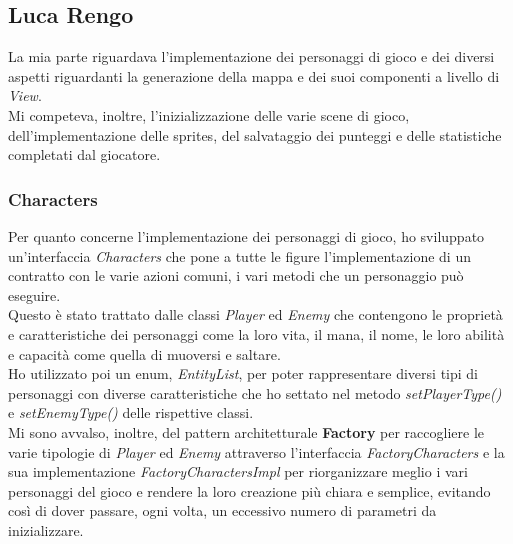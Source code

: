 
\newpage

\subsection*{Luca Rengo}

\textsf{\small La mia parte riguardava l'implementazione dei personaggi di gioco e dei diversi aspetti riguardanti la generazione della mappa e dei suoi componenti a livello di \emph{View}.}\\

\textsf{\small Mi competeva, inoltre, l'inizializzazione delle varie scene di gioco, dell'implementazione delle sprites, del salvataggio dei punteggi e delle statistiche completati dal giocatore.}\\ 

\subsubsection*{Characters}

\textsf{\small Per quanto concerne l'implementazione dei personaggi di gioco, ho sviluppato un'interfaccia \emph{Characters} che pone a tutte le figure l'implementazione di un contratto con le varie azioni comuni, i vari metodi che un personaggio può eseguire.}\\

\textsf{\small Questo è stato trattato dalle classi \emph{Player} ed \emph{Enemy} che contengono le proprietà e caratteristiche dei personaggi come la loro vita, il mana, il nome, le loro abilità e capacità come quella di muoversi e saltare.}\\

\textsf{\small Ho utilizzato poi un enum, \emph{EntityList}, per poter rappresentare diversi tipi di personaggi con diverse caratteristiche che ho settato nel metodo \emph{setPlayerType()} e \emph{setEnemyType()} delle rispettive classi. }\\

\textsf{\small Mi sono avvalso, inoltre, del pattern architetturale \textbf{Factory} per raccogliere le varie tipologie di \emph{Player} ed \emph{Enemy} attraverso l'interfaccia \emph{FactoryCharacters} e la sua implementazione \emph{FactoryCharactersImpl} per riorganizzare meglio i vari personaggi del gioco e rendere la loro creazione più chiara e semplice, evitando così di dover passare, ogni volta, un eccessivo numero di parametri da inizializzare.}

